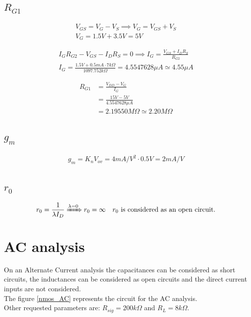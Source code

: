 \documentclass[10pt,a4paper]{book}
\begin{document}
\subsection{$R_{G1}$}
\begin{align}
V_{GS} = V_G - V_S \implies
V_G = V_{GS} + V_S\\
V_G = 1.5V + 3.5V = 5V
\end{align}

\begin{align}
I_G R_{G2} - V_{GS} - I_D R_S = 0 \implies
I_G = \frac{V_{GS}+I_D R_S}{R_{G2}}\\
I_G = \frac{1.5V + 0.5mA \cdot 7k\Omega}{1097.752k\Omega} = 4.5547628\mu A \simeq 4.55 \mu A
\end{align}

\begin{align}
R_{G1} &= \frac{V_{DD} - V_G}{I_G}\\
&= \frac{15V - 5V}{4.5547628 \mu A}\\
&=2.19550 M\Omega \simeq 2.20 M\Omega
\end{align}

\subsection{$g_m$}
\begin{align}
g_m = K_n V_{ov} = 4 mA/V^2 \cdot 0.5V = 2 mA/V
\end{align}

\subsection{$r_0$}
\begin{gather}
r_0 = \frac{1}{\lambda I_D} \xRightarrow{\lambda = 0} r_0 = \infty  \quad r_0 \text{ is considered as an open circuit.}
\end{gather}


\section{AC analysis}
On an Alternate Current analysis the capacitances can be considered as short circuits, the inductances can be considered as open circuits and the direct current inputs are not considered.\\
The figure \ref{nmos_AC} represents the circuit for the AC analysis.\\
Other requested parameters are: $R_{sig} = 200k\Omega$ and $R_L = 8k\Omega$.\par
\end{document}
